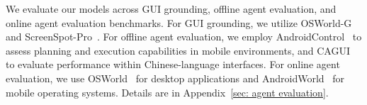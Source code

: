 \documentclass{llmxive}
\begin{document}
We evaluate our models across GUI grounding, offline agent evaluation, and online agent evaluation benchmarks. For GUI grounding, we utilize OSWorld-G~\citep{xie2025scaling} and ScreenSpot-Pro~\citep{li2025screenspot}. For offline agent evaluation, we employ AndroidControl~\citep{li2024effects} to assess planning and execution capabilities in mobile environments, and CAGUI~\citep{zhang2025agentcpm} to evaluate performance within Chinese-language interfaces. For online agent evaluation, we use OSWorld~\citep{xie2024osworld} for desktop applications and AndroidWorld~\citep{rawles2024androidworld} for mobile operating systems. Details are in Appendix~\ref{sec: agent evaluation}.
\end{document}
